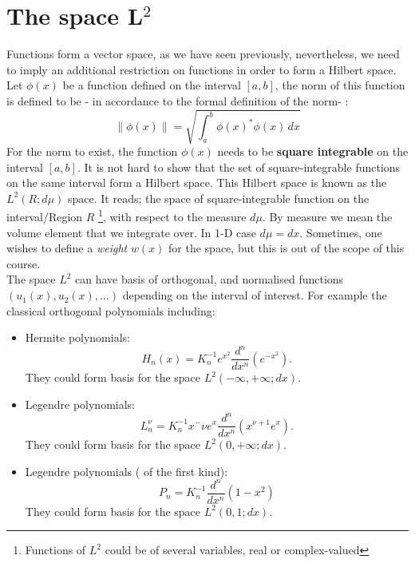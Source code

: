  	   \section{The space L$^2$}
 	   Functions form a vector space, as we have seen previously, nevertheless, we need to imply an additional restriction on functions in order to form a Hilbert space. Let $ \phi(x)$  be a function defined on the interval $ [a,b]$, the norm of this function is defined to be - in accordance to the formal definition of the norm- :
 	   \begin{equation}
 	   \lVert \phi(x) \rVert= \sqrt{\int_a ^b \phi(x)^* \phi(x) \,dx}
 	   \end{equation}
 	   For the norm to exist, the function $\phi(x)$ needs to be \textbf{square integrable} on the interval $ [a,b]$. It is not hard to show that the set of square-integrable functions on the same interval form a Hilbert space. This Hilbert space is known as the $ L^2( R; d\mu)$ space. It reads; the space of square-integrable function on the interval/Region $R$ \footnote{ Functions of $L^2$ could be of several variables, real or complex-valued}, with respect to the measure $ d\mu$. By measure we mean the volume element that we integrate over. In 1-D case $ d\mu =dx$.  Sometimes, one wishes to define a \textit{weight} $w(x)$ for the space, but this is out of the scope of this course.\\ 
 	   The space $L^2$  can have basis of orthogonal, and normalised functions $ ( u_1(x), u_2(x), \dots)$ depending on the interval of interest. For example the classical orthogonal polynomials including:
 	   \begin{itemize}
 	   	\item Hermite polynomials:
 	   	\begin{equation}
 	   	H_n(x) = K_n^{-1} e^{x^2} \dfrac{d^n}{dx^n}\left( e^{-x^2}\right) .
 	   	\end{equation}
 	   	They could form  basis for the space $L^2(-\infty, + \infty; dx)$. 
 	  
 	   \item Legendre polynomials:
 	   \begin{equation}
 	   L^\nu _n = K^{-1}_n x^-\nu e^x \dfrac{d^n}{dx^n}\left( x^{ \nu +1} e^x\right) .
 	   \end{equation}
 	   	They could form  basis for the space $L^2(0, + \infty; dx)$.
 	   	\item Legendre polynomials ( of the first kind):
 	   	\begin{equation}
 	   	P_n = K^{-1}_n \dfrac{d^n}{dx^n}\left( 1-x^2\right) 
 	   	\end{equation}
 	   		They could form  basis for the space $L^2(0, 1; dx)$.
 	    \end{itemize}
